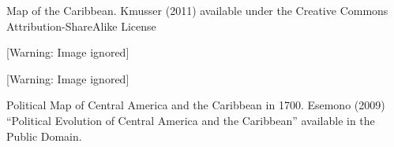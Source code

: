 \begin{styleStandard}
Map of the Caribbean. Kmusser (2011) available under the Creative Commons Attribution-ShareAlike License
\end{styleStandard}

\begin{center}
 [Warning: Image ignored] %

\end{center}
\begin{styleStandard}\bfseries

\end{styleStandard}

\begin{center}
 [Warning: Image ignored] %

\end{center}
\begin{styleStandard}
Political Map of Central America and the Caribbean in 1700. Esemono (2009) “Political Evolution of Central America and the Caribbean” available in the Public Domain.
\end{styleStandard}

